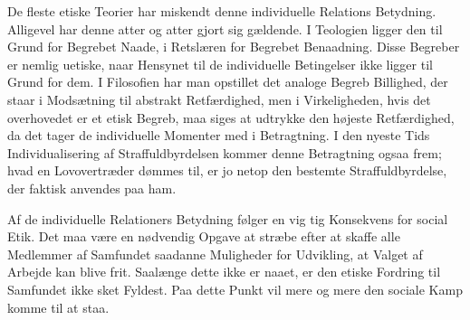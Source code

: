 \documentclass[12pt]{article}
\newcommand{\opage}[1]{\marginnote{\footnotesize\textit{[#1]}}}
\begin{document}
De fleste etiske Teorier har miskendt denne individuelle Relations
Betydning. Alligevel har denne atter og atter gjort sig gældende. I
Teologien ligger den til Grund for Begrebet Naade, i Retslæren for
Begrebet Benaadning. Disse Begreber er nemlig uetiske, naar Hensynet
til de individuelle Betingelser ikke ligger til Grund for dem. I
Filosofien har man opstillet det analoge Begreb Billighed, der staar i
Modsætning til abstrakt Retfærdighed, men i Virkeligheden, hvis det
overhovedet er et etisk Begreb, maa siges at udtrykke den højeste
Retfærdighed, da det tager de individuelle Momenter med i Betragtning.
I den nyeste Tids Individualisering af Straffuldbyrdelsen kommer denne
Betragtning ogsaa frem; hvad en Lovovertræder dømmes til, er jo netop
den bestemte Straffuldbyrdelse, der faktisk anvendes paa ham.

Af de individuelle Relationers Betydning følger en vig%
\opage{92}tig Konsekvens for social Etik. Det maa være en nødvendig Opgave at
stræbe efter at skaffe alle Medlemmer af Samfundet saadanne Muligheder
for Udvikling, at Valget af Arbejde kan blive frit. Saalænge dette
ikke er naaet, er den etiske Fordring til Samfundet ikke sket Fyldest.
Paa dette Punkt vil mere og mere den sociale Kamp komme til at staa.
\end{document}
